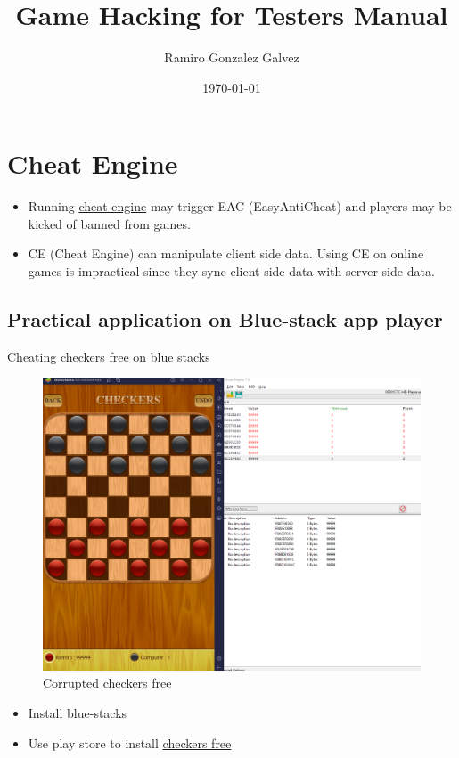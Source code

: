 \documentclass[12pt]{article}
\begin{document}
\title{ Game  Hacking for Testers Manual}
\author{Ramiro Gonzalez Galvez}
\date{\today}

\maketitle
\section{Cheat Engine}
\begin{itemize}
    \item Running \href{https://www.cheatengine.org/}{\color{blue}cheat engine\color{black}} may trigger EAC (EasyAntiCheat) and players may be kicked of banned from games.
    \item CE (Cheat Engine) can manipulate client side data. Using CE on online games is impractical since they sync client side data with server side data. 
\end{itemize}
\subsection{Practical application on Blue-stack app player} 
Cheating checkers free on blue stacks 
\begin{figure}[!htp]
    \centering
    \includegraphics[width=16cm]{images/Hacking-Free-Checkers.PNG}
    \caption{Corrupted checkers free}
    \label{fig:galaxy}
\end{figure}
\begin{itemize}
    \item Install blue-stacks 
    \item Use play store to install \href{https://play.google.com/store/apps/details?id=com.optimesoftware.checkers.free&hl=en_US&gl=US} {\color{blue}checkers free \color{black}} 
\end{itemize}
\end{document}
